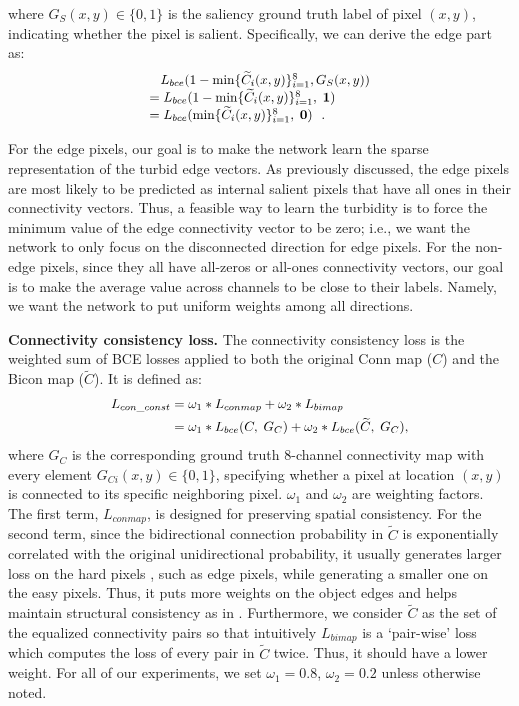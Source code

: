\documentclass[final]{cvpr}
\newcommand*{\Scale}[2][4]{\scalebox{#1}{$#2$}}%
\begin{document}
where  $G_S(x,y)\in \{0,1\}$ is the saliency ground truth label of pixel $(x,y)$, indicating whether the pixel is salient. Specifically, we can derive the edge part as:
\begin{equation}
\Scale[0.95]{
\begin{array}{l}
\;\;\;{L_{bce}}(1 - \min \{ {\widetilde C_i}(x,y)\} _{i = 1}^8,{G_S}(x,y))\\
 = {L_{bce}}(1 - \min \{ {\widetilde C_i}(x,y)\} _{i = 1}^8,\;{\textbf{1}})\\ 
 = {L_{bce}}(\min \{ {\widetilde C_i}(x,y)\} _{i = 1}^8,\;{\textbf{0}})\ \ .
\end{array}}
\end{equation}

For the edge pixels, our goal is to make the network learn the sparse representation of the turbid edge vectors. As previously discussed, the edge pixels are most likely to be predicted as internal salient pixels that have all ones in their connectivity vectors. Thus, a feasible way to learn the turbidity is to force the minimum value of the edge connectivity vector to be zero; i.e., we want the network to only focus on the disconnected direction for edge pixels. For the non-edge pixels, since they all have all-zeros or all-ones connectivity vectors, our goal is to make the average value across channels to be close to their labels. Namely, we want the network to put uniform weights among all directions.

\textbf{Connectivity consistency loss.} The connectivity consistency loss is the weighted sum of BCE losses applied to both the original Conn map ($C$) and the Bicon map ($\widetilde{C}$). It is defined as:
\begin{equation}
\Scale[0.95]{
\begin{split}
{L_{con\_const}} &= {\omega _1}*{L_{conmap}} + {\omega _2}*{L_{bimap}}\\
 &= {\omega _1}*{L_{bce}}(C,\;{G_C}) + {\omega _2}*{L_{bce}}(\widetilde C,\;{G_C}),
\end{split}}
\end{equation}
where $G_C$ is the corresponding ground truth 8-channel connectivity map with every element $G_{Ci}(x,y) \in \{ 0,1\}$, specifying whether a pixel at location $(x,y)$ is connected to its specific neighboring pixel. $\omega _1$ and $\omega _2$ are weighting factors. The first term, $L_{conmap}$, is designed for preserving spatial consistency. For the second term, since the bidirectional connection probability in $\widetilde{C}$ is exponentially correlated with the original unidirectional probability, it usually generates larger loss on the hard pixels \cite{f3net}, such as edge pixels, while generating a smaller one on the easy pixels. Thus, it puts more weights on the object edges and helps maintain structural consistency as in \cite{f3net}. Furthermore, we consider $\widetilde{C}$ as the set of the equalized connectivity pairs so that intuitively $L_{bimap}$ is a ‘pair-wise’ loss which computes the loss of every pair in $\widetilde{C}$ twice. Thus, it should have a lower weight. For all of our experiments, we set $\omega _1=0.8$, $\omega _2=0.2$ unless otherwise noted. 
\end{document}
